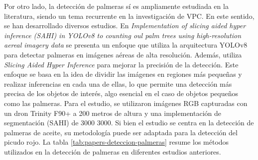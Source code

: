 
Por otro lado, la detección de palmeras sí es ampliamente estudiada en la literatura, siendo un tema recurrente en la investigación de VPC. En este sentido, se han desarrollado diversos estudios. En \textit{Implementation of slicing aided hyper inference (SAHI) in YOLOv8 to counting oul palm trees using high-resolution aereal imagery data} \citep{zhorif_implementation_2024} se presenta un enfoque que utiliza la arquitectura YOLOv8 para detectar palmeras en imágenes aéreas de alta resolución. Además, utiliza \textit{Slicing Aided Hyper Inference} para mejorar la precisión de la detección. Este enfoque se basa en la idea de dividir las imágenes en regiones más pequeñas y realizar inferencias en cada una de ellas, lo que permite una detección más precisa de los objetos de interés, algo esencial en el caso de objetos pequeños como las palmeras. Para el estudio, se utilizaron imágenes RGB capturadas con un dron Trinity F90+ a 200 metros de altura y una implementación de segmentación (SAHI) de \SI{3000}{}\,\texttimes\,\SI{3000}{\pixel}. Si bien el estudio se centra en la detección de palmeras de aceite, su metodología puede ser adaptada para la detección del picudo rojo. La tabla \ref{tab:papers-deteccion-palmeras} resume los métodos utilizados en la detección de palmeras en diferentes estudios anteriores.

